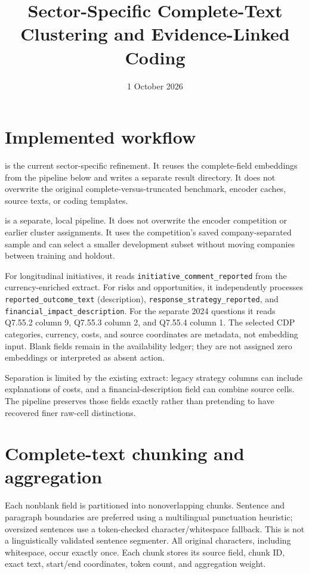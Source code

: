 \documentclass[11pt,a4paper]{article}
\title{Sector-Specific Complete-Text Clustering and Evidence-Linked Coding}
\author{}
\date{1 October 2026}
\begin{document}
\maketitle

\section{Implemented workflow}
 is the current
sector-specific refinement. It reuses the complete-field embeddings from the
pipeline below and writes a separate result directory. It does not overwrite
the original complete-versus-truncated benchmark, encoder caches, source
texts, or coding templates.

 is a separate, local
pipeline. It does not overwrite the encoder competition or earlier cluster
assignments. It uses the competition's saved company-separated sample and
can select a smaller development subset without moving companies between
training and holdout.

For longitudinal initiatives, it reads
\texttt{initiative\_comment\_reported} from the currency-enriched extract.
For risks and opportunities, it independently processes
\texttt{reported\_outcome\_text} (description),
\texttt{response\_strategy\_reported}, and
\texttt{financial\_impact\_description}.
For the separate 2024 questions it reads Q7.55.2 column 9,
Q7.55.3 column 2, and Q7.55.4 column 1.
The selected CDP categories, currency, costs, and source coordinates are
metadata, not embedding input. Blank fields remain in the availability
ledger; they are not assigned zero embeddings or interpreted as absent action.

Separation is limited by the existing extract: legacy strategy columns can
include explanations of costs, and a financial-description field can
combine source cells. The pipeline preserves those fields exactly rather
than pretending to have recovered finer raw-cell distinctions.

\section{Complete-text chunking and aggregation}
Each nonblank field is partitioned into nonoverlapping chunks. Sentence
and paragraph boundaries are preferred using a multilingual punctuation
heuristic; oversized sentences use a token-checked character/whitespace
fallback. This is not a linguistically validated sentence segmenter.
All original characters, including whitespace, occur exactly once.
Each chunk stores its source field, chunk ID, exact text, start/end
coordinates, token count, and aggregation weight.
\end{document}
